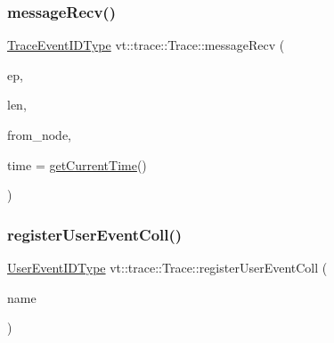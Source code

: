 \subsubsection{\texorpdfstring{message\+Recv()}{messageRecv()}}
{\footnotesize\ttfamily \hyperlink{namespacevt_1_1trace_a64a7185f3e102df8d8258f263ccd1582}{Trace\+Event\+I\+D\+Type} vt\+::trace\+::\+Trace\+::message\+Recv (\begin{DoxyParamCaption}\item[{\hyperlink{namespacevt_1_1trace_a3c14050715ba9eceaeff51fb3de64f2f}{Trace\+Entry\+I\+D\+Type} const}]{ep,  }\item[{\hyperlink{namespacevt_1_1trace_aeb598f45d67d41db7902e494f2f0ce59}{Trace\+Msg\+Len\+Type} const}]{len,  }\item[{\hyperlink{namespacevt_a866da9d0efc19c0a1ce79e9e492f47e2}{Node\+Type} const}]{from\+\_\+node,  }\item[{double const}]{time = {\ttfamily \hyperlink{structvt_1_1trace_1_1_trace_a04cf6b76b4ced1bc90d246a34c948db5}{get\+Current\+Time}()} }\end{DoxyParamCaption})}

\mbox{\label{structvt_1_1trace_1_1_trace_a9a106f7f39e605745994d20bb526f8cf}} 
\subsubsection{\texorpdfstring{register\+User\+Event\+Coll()}{registerUserEventColl()}}
{\footnotesize\ttfamily \hyperlink{namespacevt_1_1trace_a5908920d051c144c89f17c69ed262350}{User\+Event\+I\+D\+Type} vt\+::trace\+::\+Trace\+::register\+User\+Event\+Coll (\begin{DoxyParamCaption}\item[{std\+::string const \&}]{name }\end{DoxyParamCaption})}

\mbox{\label{structvt_1_1trace_1_1_trace_a1b80a8ca6bebbfbe61f8b119342e14f7}} 
